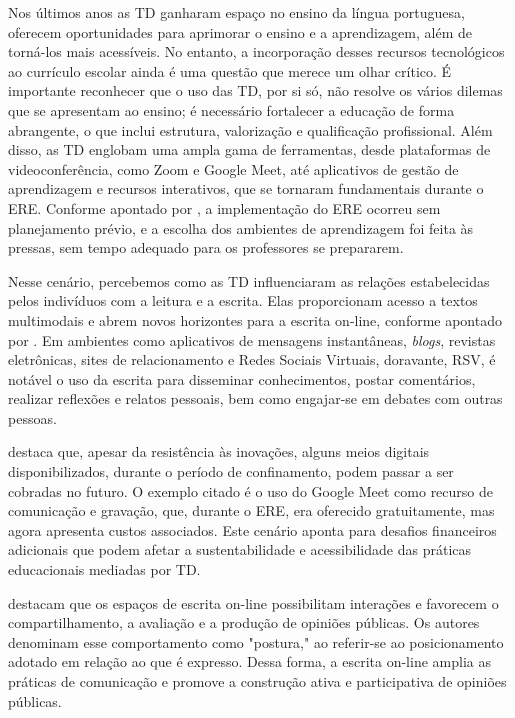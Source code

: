 \documentclass[portuguese]{textolivre}
\begin{document}
Nos últimos anos as TD ganharam espaço no ensino da língua portuguesa, oferecem oportunidades para aprimorar o ensino e a aprendizagem, além de torná-los mais acessíveis. No entanto, a incorporação desses recursos tecnológicos ao currículo escolar ainda é uma questão que merece um olhar crítico. É importante reconhecer que o uso das TD, por si só, não resolve os vários dilemas que se apresentam ao ensino; é necessário fortalecer a educação de forma abrangente, o que inclui estrutura, valorização e qualificação profissional. Além disso, as TD englobam uma ampla gama de ferramentas, desde plataformas de videoconferência, como Zoom e Google Meet, até aplicativos de gestão de aprendizagem e recursos interativos, que se tornaram fundamentais durante o ERE. Conforme apontado por \textcite[p. 15]{coscarelli2020}, a implementação do ERE ocorreu sem planejamento prévio, e a escolha dos ambientes de aprendizagem foi feita às pressas, sem tempo adequado para os professores se prepararem.

Nesse cenário, percebemos como as TD influenciaram as relações estabelecidas pelos indivíduos com a leitura e a escrita. Elas proporcionam acesso a textos multimodais e abrem novos horizontes para a escrita on-line, conforme apontado por \textcite{barton2015}. Em ambientes como aplicativos de mensagens instantâneas, \textit{blogs}, revistas eletrônicas, sites de relacionamento e Redes Sociais Virtuais, doravante, RSV, é notável o uso da escrita para disseminar conhecimentos, postar comentários, realizar reflexões e relatos pessoais, bem como engajar-se em debates com outras pessoas.

\textcite{paiva2020ensino} destaca que, apesar da resistência às inovações, alguns meios digitais disponibilizados, durante o período de confinamento, podem passar a ser cobradas no futuro. O exemplo citado é o uso do Google Meet como recurso de comunicação e gravação, que, durante o ERE, era oferecido gratuitamente, mas agora apresenta custos associados. Este cenário aponta para desafios financeiros adicionais que podem afetar a sustentabilidade e acessibilidade das práticas educacionais mediadas por TD.

\textcite{barton2015} destacam que os espaços de escrita on-line possibilitam interações e favorecem o compartilhamento, a avaliação e a produção de opiniões públicas. Os autores denominam esse comportamento como "postura," ao referir-se ao posicionamento adotado em relação ao que é expresso. Dessa forma, a escrita on-line amplia as práticas de comunicação e promove a construção ativa e participativa de opiniões públicas.
\end{document}
